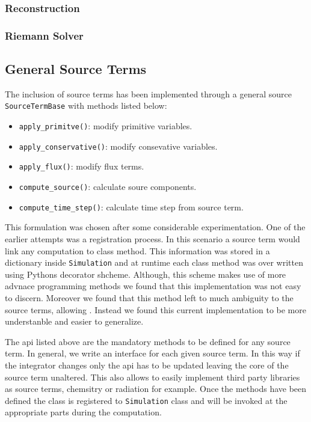 \subsubsection{Reconstruction}
\subsubsection{Riemann Solver}

\subsection{General Source Terms}
The inclusion of source terms has been implemented through a general source
\lstinline{SourceTermBase} with methods listed below:
\begin{itemize}
    \item \lstinline{apply_primitve()}: modify primitive variables.
    \item \lstinline{apply_conservative()}: modify consevative variables.
    \item \lstinline{apply_flux()}: modify flux terms.
    \item \lstinline{compute_source()}: calculate soure components.
    \item \lstinline{compute_time_step()}: calculate time step from source term.
\end{itemize}
This formulation was chosen after some considerable experimentation. One of the
earlier attempts was a registration process. In this scenario a source term
would link any computation to class method. This information was stored
in a dictionary inside \lstinline{Simulation} and at runtime each class method
was over written using Pythons decorator shcheme. Although, this scheme makes
use of more advnace programming methods we found that this implementation was
not easy to discern. Moreover we found that this method left to much ambiguity
to the source terms, allowing . Instead we
found this current implementation to be more understanble and easier to
generalize.

The api listed above are the mandatory methods to be defined for any source
term. In general, we write an interface for each given source term. In this
way if the integrator changes only the api has to be updated leaving
the core of the source term unaltered. This also allows to easily implement
third party libraries as source terms, chemsitry or radiation for example.
Once the methods have been defined the class is registered to 
\lstinline{Simulation} class and will be invoked at the appropriate parts
during the computation.

